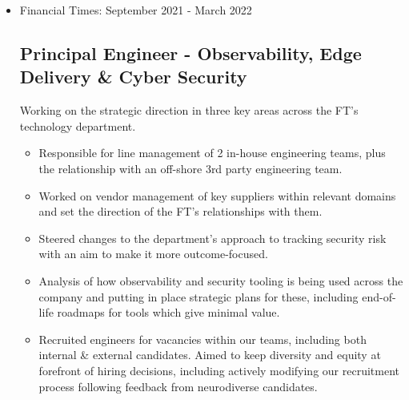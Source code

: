 \documentclass[a4paper]{article}
\newenvironment{detail}{\begin{adjustwidth}{10pt}{}}{\end{adjustwidth}}
\begin{document}
\begin{itemize}
\begin{detail}
\begin{itemize}
	\item Built a new centralised cyber security function, bringing together people, process and budgets from across the organization.  This reduced barriers in communication and led to better-aligned security outcomes.
	\item Line managed a mixed-discipline team of a dozen people, including Engineers, Risk Analysts and IT governance roles.
	\item Steered the direction of Security work across the technology department, and the organisation as a whole.
	\item Worked with a third party consultancy to build a strategic roadmap and help prioritise security initiatives.
	\item Involved in recruitment of a permanent VP of Cyber Security.
\end{itemize}
\end{detail}

\item Financial Times: September 2021 - March 2022
\subsection*{Principal Engineer - Observability, Edge Delivery \& Cyber Security}
\begin{detail}
Working on the strategic direction in three key areas across the FT's technology department.

\begin{itemize}
	\item Responsible for line management of 2 in-house engineering teams, plus the relationship with an off-shore 3rd party engineering team.
	\item Worked on vendor management of key suppliers within relevant domains and set the direction of the FT's relationships with them.
	\item Steered changes to the department's approach to tracking security risk with an aim to make it more outcome-focused.
	\item Analysis of how observability and security tooling is being used across the company and putting in place strategic plans for these, including end-of-life roadmaps for tools which give minimal value.
	\item Recruited engineers for vacancies within our teams, including both internal \& external candidates.  Aimed to keep diversity and equity at forefront of hiring decisions, including actively modifying our recruitment process following feedback from neurodiverse candidates.
\end{itemize}
\end{detail}


\end{itemize}
\end{document}
